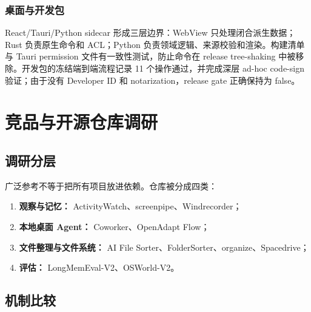 \documentclass[UTF8,fontset=none,zihao=-4,openany]{ctexrep}
\begin{document}
\subsection{桌面与开发包}

React/Tauri/Python sidecar 形成三层边界：WebView 只处理闭合派生数据；Rust 负责原生命令和 ACL；Python 负责领域逻辑、来源校验和渲染。构建清单与 Tauri permission 文件有一致性测试，防止命令在 release tree-shaking 中被移除。开发包的冻结端到端流程记录 11 个操作通过，并完成深层 ad-hoc code-sign 验证；由于没有 Developer ID 和 notarization，release gate 正确保持为 false。

\chapter{竞品与开源仓库调研}

\section{调研分层}

广泛参考不等于把所有项目放进依赖。仓库被分成四类：

\begin{enumerate}
  \item \textbf{观察与记忆：} ActivityWatch、screenpipe、Windrecorder；
  \item \textbf{本地桌面 Agent：} Coworker、OpenAdapt Flow；
  \item \textbf{文件整理与文件系统：} AI File Sorter、FolderSorter、organize、Spacedrive；
  \item \textbf{评估：} LongMemEval-V2、OSWorld-V2。
\end{enumerate}

\section{机制比较}
\end{document}
